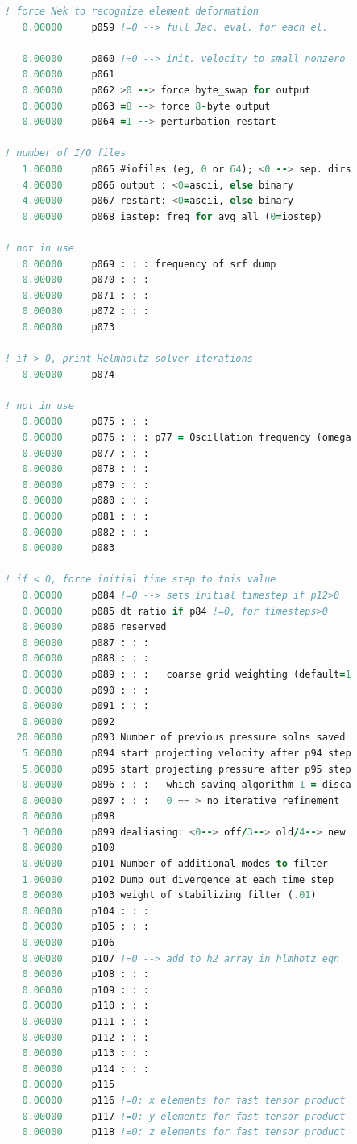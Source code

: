 \documentclass[10pt]{article}
\numberwithin{equation}{section} %
\begin{document}
\begin{itemize}
\begin{lstlisting}[language=Fortran]
! force Nek to recognize element deformation
   0.00000     p059 !=0 --> full Jac. eval. for each el.
   
   0.00000     p060 !=0 --> init. velocity to small nonzero
   0.00000     p061
   0.00000     p062 >0 --> force byte_swap for output
   0.00000     p063 =8 --> force 8-byte output
   0.00000     p064 =1 --> perturbation restart

! number of I/O files
   1.00000     p065 #iofiles (eg, 0 or 64); <0 --> sep. dirs
   4.00000     p066 output : <0=ascii, else binary
   4.00000     p067 restart: <0=ascii, else binary
   0.00000     p068 iastep: freq for avg_all (0=iostep)

! not in use
   0.00000     p069 : : : frequency of srf dump
   0.00000     p070 : : :
   0.00000     p071 : : :
   0.00000     p072 : : :
   0.00000     p073

! if > 0, print Helmholtz solver iterations
   0.00000     p074

! not in use
   0.00000     p075 : : :
   0.00000     p076 : : : p77 = Oscillation frequency (omega
   0.00000     p077 : : :
   0.00000     p078 : : :
   0.00000     p079 : : :
   0.00000     p080 : : :
   0.00000     p081 : : :
   0.00000     p082 : : :
   0.00000     p083

! if < 0, force initial time step to this value
   0.00000     p084 !=0 --> sets initial timestep if p12>0
   0.00000     p085 dt ratio if p84 !=0, for timesteps>0
   0.00000     p086 reserved
   0.00000     p087 : : :
   0.00000     p088 : : :
   0.00000     p089 : : :   coarse grid weighting (default=1
   0.00000     p090 : : :
   0.00000     p091 : : :
   0.00000     p092
  20.00000     p093 Number of previous pressure solns saved
   5.00000     p094 start projecting velocity after p94 step
   5.00000     p095 start projecting pressure after p95 step
   0.00000     p096 : : :   which saving algorithm 1 = disca
   0.00000     p097 : : :   0 == > no iterative refinement
   0.00000     p098
   3.00000     p099 dealiasing: <0--> off/3--> old/4--> new
   0.00000     p100
   0.00000     p101 Number of additional modes to filter
   1.00000     p102 Dump out divergence at each time step
   0.00000     p103 weight of stabilizing filter (.01)
   0.00000     p104 : : :
   0.00000     p105 : : :
   0.00000     p106
   0.00000     p107 !=0 --> add to h2 array in hlmhotz eqn
   0.00000     p108 : : :
   0.00000     p109 : : :
   0.00000     p110 : : :
   0.00000     p111 : : :
   0.00000     p112 : : :
   0.00000     p113 : : :
   0.00000     p114 : : :
   0.00000     p115
   0.00000     p116 !=0: x elements for fast tensor product
   0.00000     p117 !=0: y elements for fast tensor product
   0.00000     p118 !=0: z elements for fast tensor product


\end{lstlisting}
\end{itemize}
\end{document}
